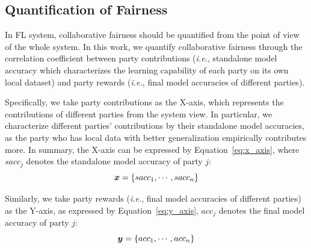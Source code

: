 \documentclass{article}
\def\vec#1{\mathchoice{\mbox{\boldmath$\displaystyle#1$}}
  {\mbox{\boldmath$\textstyle#1$}}
  {\mbox{\boldmath$\scriptstyle#1$}}
  {\mbox{\boldmath$\scriptscriptstyle#1$}}}
\newcommand{\ie}{\textit{i.e.},\xspace}
\begin{document}
\subsection{Quantification of Fairness}
In FL system, collaborative fairness should be quantified from the point of view of the whole system. In this work, we quantify collaborative fairness through the correlation coefficient between party contributions (\ie standalone model accuracy which characterizes the learning capability of each party on its own local dataset) %
and party rewards (\ie final model accuracies of different parties). 

Specifically, we take party contributions as the X-axis, which represents the contributions of different parties from the system view. In particular, %
we characterize different parties' contributions by their %
standalone model accuracies, as the party who %
has local data with better generalization empirically contributes more. %
In summary, the X-axis can be expressed by Equation~\ref{eq:x_axis}, where $sacc_j$ denotes the standalone model accuracy of party $j$:%
\begin{equation}\label{eq:x_axis}
\vec{x}=\{sacc_1,\cdots,sacc_n\}
\end{equation}

Similarly, we take party rewards (\ie final model accuracies of different parties) as the Y-axis, as expressed by Equation~\ref{eq:y_axis}, $acc_j$ denotes the final model accuracy of party $j$:
\begin{equation}\label{eq:y_axis}
\vec{y}=\{acc_1,\cdots,acc_n\}
\end{equation}
\end{document}
